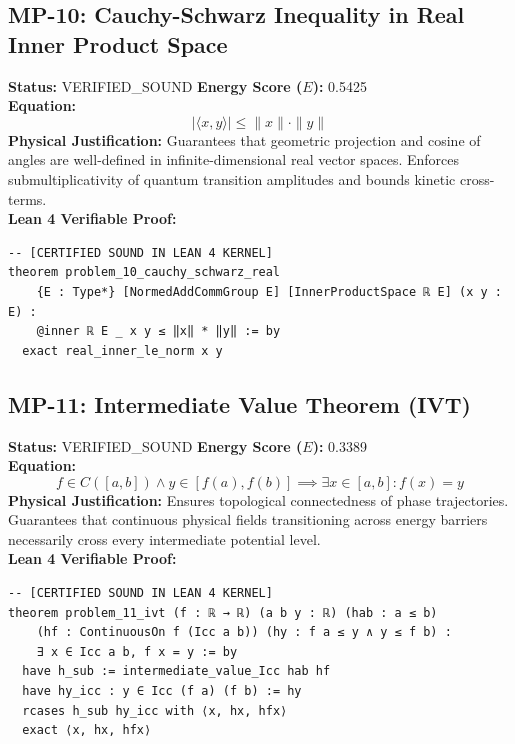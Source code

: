 \documentclass[11pt, a4paper]{article}
\begin{document}
\subsection{MP-10: Cauchy-Schwarz Inequality in Real Inner Product Space}
\textbf{Status:} VERIFIED\_SOUND \hfill \textbf{Energy Score ($E$):} 0.5425\\
\textbf{Equation:}
\begin{equation*}
|\langle x, y \rangle| \le \|x\| \cdot \|y\|
\end{equation*}
\textbf{Physical Justification:} Guarantees that geometric projection and cosine of angles are well-defined in infinite-dimensional real vector spaces. Enforces submultiplicativity of quantum transition amplitudes and bounds kinetic cross-terms.\\
\textbf{Lean 4 Verifiable Proof:}
\begin{verbatim}
-- [CERTIFIED SOUND IN LEAN 4 KERNEL]
theorem problem_10_cauchy_schwarz_real
    {E : Type*} [NormedAddCommGroup E] [InnerProductSpace ℝ E] (x y : E) :
    @inner ℝ E _ x y ≤ ‖x‖ * ‖y‖ := by
  exact real_inner_le_norm x y

\end{verbatim}

\subsection{MP-11: Intermediate Value Theorem (IVT)}
\textbf{Status:} VERIFIED\_SOUND \hfill \textbf{Energy Score ($E$):} 0.3389\\
\textbf{Equation:}
\begin{equation*}
f \in C([a, b]) \wedge y \in [f(a), f(b)] \implies \exists x \in [a, b]: f(x) = y
\end{equation*}
\textbf{Physical Justification:} Ensures topological connectedness of phase trajectories. Guarantees that continuous physical fields transitioning across energy barriers necessarily cross every intermediate potential level.\\
\textbf{Lean 4 Verifiable Proof:}
\begin{verbatim}
-- [CERTIFIED SOUND IN LEAN 4 KERNEL]
theorem problem_11_ivt (f : ℝ → ℝ) (a b y : ℝ) (hab : a ≤ b) 
    (hf : ContinuousOn f (Icc a b)) (hy : f a ≤ y ∧ y ≤ f b) : 
    ∃ x ∈ Icc a b, f x = y := by
  have h_sub := intermediate_value_Icc hab hf
  have hy_icc : y ∈ Icc (f a) (f b) := hy
  rcases h_sub hy_icc with ⟨x, hx, hfx⟩
  exact ⟨x, hx, hfx⟩

\end{verbatim}
\end{document}
